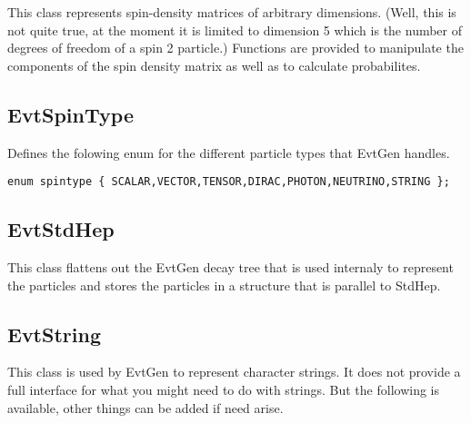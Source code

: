 This class represents spin-density matrices of
arbitrary dimensions. (Well, this is not quite true, at the 
moment it is limited to dimension 5 which is the number of 
degrees of freedom of a spin 2 particle.) 
Functions are provided to manipulate the components of the
spin density matrix as well as to  
calculate probabilites.


\subsection{EvtSpinType}

Defines the folowing enum for the different particle types
that EvtGen handles.

\begin{verbatim}
enum spintype { SCALAR,VECTOR,TENSOR,DIRAC,PHOTON,NEUTRINO,STRING };
\end{verbatim}


\subsection{EvtStdHep}

This class flattens out the EvtGen decay tree that is used
internaly to represent the particles and stores the 
particles in a structure that is parallel to StdHep.


\subsection{EvtString}

This class is used by EvtGen to represent character strings. It does
not provide a full interface for what you might need to do with 
strings. But the following is available, other things can be added 
if need arise.

